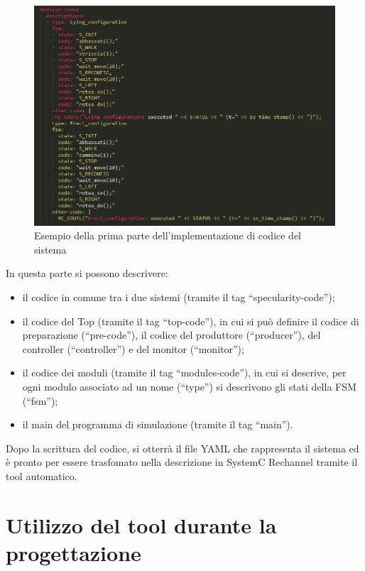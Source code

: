 \documentclass[a4paper,titlepage]{book}
\begin{document}
\begin{figure}[!ht]
\centering
\includegraphics[scale=0.6]{pyngu_code_example.png}
\caption{Esempio della prima parte dell'implementazione di codice del sistema}\label{fig:11}
\end{figure}

In questa parte si possono descrivere:

\begin{itemize}

\item il codice in comune tra i due sistemi (tramite il tag ``specularity-code'');

\item il codice del Top (tramite il tag ``top-code''), in cui si può definire il codice di preparazione (``pre-code''), il codice del produttore (``producer''),  del controller (``controller'') e del monitor (``monitor'');

\item il codice dei moduli (tramite il tag ``modules-code''), in cui si descrive, per ogni modulo associato ad un nome (``type'') si descrivono gli stati della FSM (``fsm'');

\item il main del programma di simulazione (tramite il tag ``main''). 

\end{itemize}

Dopo la scrittura del codice, si otterrà il file YAML che rappresenta il sistema ed è pronto per essere trasfomato nella descrizione in SystemC Rechannel tramite il tool automatico.


\section{Utilizzo del tool durante la progettazione}
\end{document}
